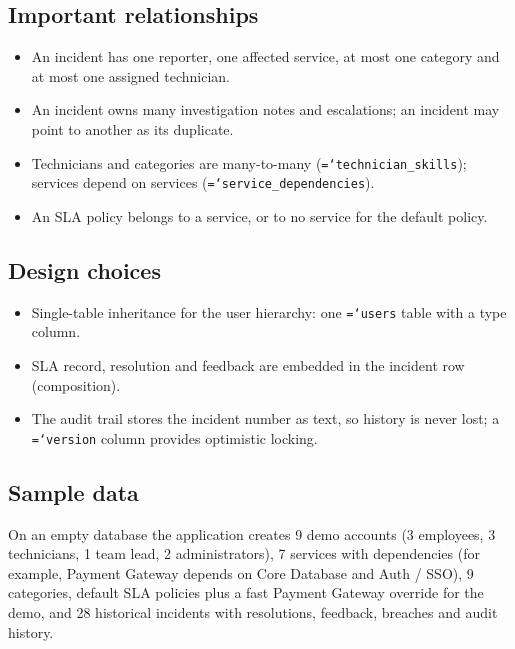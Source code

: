 \documentclass[11pt,a4paper]{article}
\newcommand{\code}[1]{\texttt{\hyphenchar\font=`\-\relax #1}}
\begin{document}
\subsection{Important relationships}
\begin{itemize}
  \item An incident has one reporter, one affected service, at most one category and at most one assigned technician.
  \item An incident owns many investigation notes and escalations; an incident may point to another as its duplicate.
  \item Technicians and categories are many-to-many (\code{technician\_skills}); services depend on services (\code{service\_dependencies}).
  \item An SLA policy belongs to a service, or to no service for the default policy.
\end{itemize}

\subsection{Design choices}
\begin{itemize}
  \item Single-table inheritance for the user hierarchy: one \code{users} table with a type column.
  \item SLA record, resolution and feedback are embedded in the incident row (composition).
  \item The audit trail stores the incident number as text, so history is never lost; a \code{version} column provides optimistic locking.
\end{itemize}

\subsection{Sample data}
On an empty database the application creates 9 demo accounts (3 employees, 3 technicians, 1 team lead, 2 administrators), 7 services with dependencies (for example, Payment Gateway depends on Core Database and Auth / SSO), 9 categories, default SLA policies plus a fast Payment Gateway override for the demo, and 28 historical incidents with resolutions, feedback, breaches and audit history.

\end{document}
